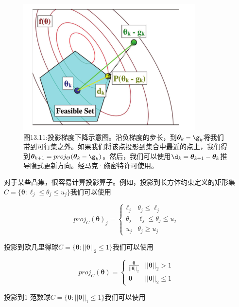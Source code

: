 \documentclass[a4paper]{article}
\begin{document}
\begin{figure}[h]
	\centering
	\includegraphics[width=0.7\linewidth]{fig13/figure11}
	\caption*{图13.11:投影梯度下降示意图。沿负梯度的步长，到$\boldsymbol{\theta}_k-\g_k$将我们带到可行集之外。如果我们将该点投影到集合中最近的点上，我们得到$\boldsymbol{\theta}_{k+1}=proj_{\varTheta}(\boldsymbol{\theta}_k-\g_k)$。然后，我们可以使用$\d_k=\boldsymbol{\theta}_{k+1}-\boldsymbol{\theta}_{k}$推导隐式更新方向。经马克·施密特许可使用。}
\end{figure}

对于某些凸集，很容易计算投影算子。例如，投影到长方体约束定义的矩形集$C=\{\boldsymbol{\theta}:\ell_j\le \theta_j\le u_j\}$我们可以使用

\begin{equation}
	proj_C(\boldsymbol{\theta})_j=\left\{
	\begin{array}{cl}
	\ell_j& \theta_j\le \ell_j\\
	\theta_j& \ell_j\le \theta_j\le u_j\\
	u_j& \theta_j\ge u_j
	\end{array}\right. \tag{13.73}
\end{equation}

投影到欧几里得球$C=\{\boldsymbol{\theta}:||\boldsymbol{\theta}||_2\le 1\}$我们可以使用

\begin{equation}
	proj_C(\boldsymbol{\theta})=\left\{
	\begin{array}{cl}
	\frac{\boldsymbol{\theta}}{||\boldsymbol{\theta}||_2}& ||\boldsymbol{\theta}||_2>1 \\
	\boldsymbol{\theta}& ||\boldsymbol{\theta}||_2\le 1
	\end{array}\right. \tag{13.74}
\end{equation}

投影到1-范数球$C=\{\boldsymbol{\theta}:||\boldsymbol{\theta}||_1\le 1\}$我们可以使用
\end{document}
